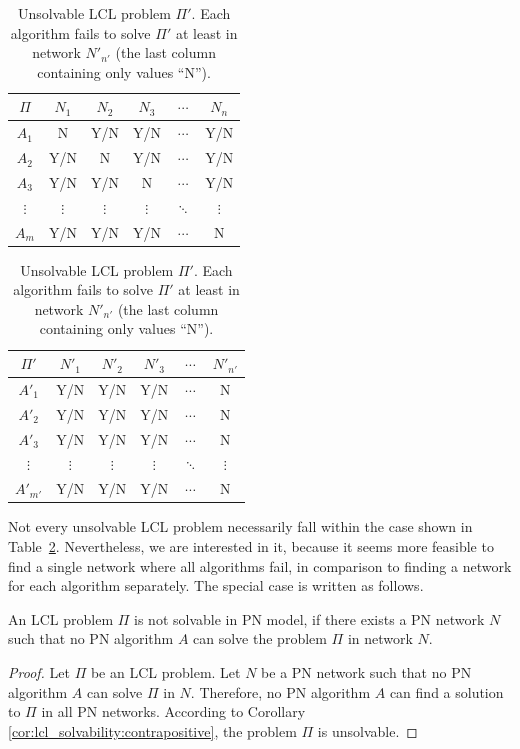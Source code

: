 \begin{table}[H]
    \parbox{.45\linewidth}{
    \centering
        \begin{tabular}{c|ccccc}
        $\Pi$&$N_1$&$N_2$&$N_3$&$\cdots$&$N_n$ \\
        \hline
        $A_1$& N & Y/N & Y/N & $\cdots$ &  Y/N  \\
        $A_2$& Y/N & N & Y/N & $\cdots$ &  Y/N  \\
        $A_3$& Y/N & Y/N & N& $\cdots$ &  Y/N  \\
        $\vdots$&$\vdots$&$\vdots$&$\vdots$&$\ddots$&$\vdots$ \\
        $A_{m}$& Y/N & Y/N & Y/N & $\cdots$ &  N \\
        \hline
        \end{tabular}
    \caption{
        Unsolvable LCL problem $\Pi$.
        Each algorithm fails to solve $\Pi$ in at least some network, denoted by ``N'' (No).
    }
    \label{tbl:unsolvable_lcl:1}
    }
    \hfill
    \parbox{.45\linewidth}{
        \centering
        \begin{tabular}{c|ccccc}
        $\Pi'$&$N'_1$&$N'_2$&$N'_3$&$\cdots$&$N'_{n'}$ \\
        \hline
        $A'_1$& Y/N & Y/N & Y/N & $\cdots$ &  N \\
        $A'_2$& Y/N & Y/N & Y/N & $\cdots$ &  N \\
        $A'_3$& Y/N & Y/N & Y/N & $\cdots$ &  N \\
        $\vdots$&$\vdots$&$\vdots$&$\vdots$&$\ddots$&$\vdots$ \\
        $A'_{m'}$& Y/N & Y/N & Y/N & $\cdots$ &  N \\
        \hline
        \end{tabular}
    \caption{
        Unsolvable LCL problem $\Pi'$.
        Each algorithm fails to solve $\Pi'$ at least in network $N'_{n'}$ (the last column containing only values ``N'').
    }
    \label{tbl:unsolvable_lcl:2}
    }
\end{table}

Not every unsolvable LCL problem necessarily fall within the case shown in Table~\ref{tbl:unsolvable_lcl:2}.
Nevertheless, we are interested in it, because it seems more feasible to find a single network where all algorithms fail, in comparison to finding a network for each algorithm separately.
The special case is written as follows.

\begin{lemma} \label{lem:lcl_unsolvability}
    An LCL problem $\Pi$ is not solvable in PN model, if there exists a PN network $N$ such that no PN algorithm $A$ can solve the problem $\Pi$ in network $N$.
\end{lemma}
\begin{proof}
    Let $\Pi$ be an LCL problem.
    Let $N$ be a PN network such that no PN algorithm $A$ can solve $\Pi$ in $N$.
    Therefore, no PN algorithm $A$ can find a solution to $\Pi$ in all PN networks.
    According to Corollary \ref{cor:lcl_solvability:contrapositive}, the problem $\Pi$ is unsolvable.
\end{proof}

